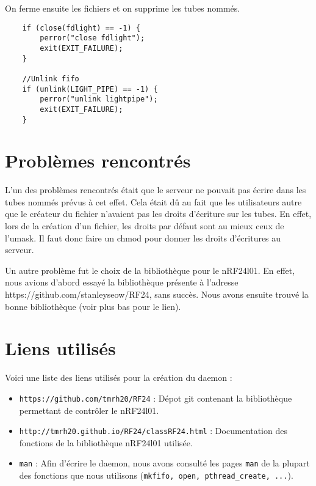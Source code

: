 On ferme ensuite les fichiers et on supprime les tubes nommés.

\begin{DDbox}{\linewidth}
\begin{lstlisting}
	if (close(fdlight) == -1) {
		perror("close fdlight");
		exit(EXIT_FAILURE);
	}

	//Unlink fifo
	if (unlink(LIGHT_PIPE) == -1) {
		perror("unlink lightpipe");
		exit(EXIT_FAILURE);
	}
\end{lstlisting}
\end{DDbox}

\section{Problèmes rencontrés}

L'un des problèmes rencontrés était que le serveur ne pouvait pas écrire
dans les tubes nommés prévus à cet effet. Cela était dû au fait que les 
utilisateurs autre que le créateur du fichier n'avaient pas les droits
d'écriture sur les tubes. En effet, lors de la création d'un fichier,
les droits par défaut sont au mieux ceux de l'umask. Il faut donc faire un chmod
pour donner les droits d'écritures au serveur.

Un autre problème fut le choix de la bibliothèque pour le nRF24l01. En effet,
nous avions d'abord essayé la bibliothèque présente à l'adresse https://github.com/stanleyseow/RF24, 
sans succès. Nous avons ensuite trouvé la bonne bibliothèque (voir plus bas pour le lien).

\section{Liens utilisés}

Voici une liste des liens utilisés pour la création du daemon : 
\begin{itemize}
\item \texttt{https://github.com/tmrh20/RF24} : Dépot git contenant la 
  bibliothèque permettant de contrôler le nRF24l01. 
\item \texttt{http://tmrh20.github.io/RF24/classRF24.html} : Documentation des
  fonctions de la bibliothèque nRF24l01 utilisée.
\item \texttt{man} : Afin d'écrire le daemon, nous avons consulté les pages 
  \texttt{man} de la plupart des fonctions que nous utilisons (\texttt{mkfifo, open,
    pthread\_create, ...}).
\end{itemize}
